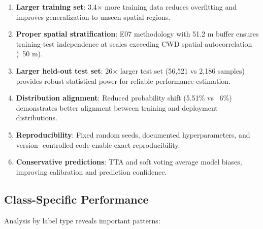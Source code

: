 \begin{enumerate}
    \item \textbf{Larger training set}: 3.4× more training data reduces overfitting and improves
          generalization to unseen spatial regions.

    \item \textbf{Proper spatial stratification}: E07 methodology with 51.2 m buffer ensures
          training-test independence at scales exceeding CWD spatial autocorrelation (~50 m).

    \item \textbf{Larger held-out test set}: 26× larger test set (56,521 vs 2,186 samples)
          provides robust statistical power for reliable performance estimation.

    \item \textbf{Distribution alignment}: Reduced probability shift (5.51\% vs ~6\%) demonstrates
          better alignment between training and deployment distributions.

    \item \textbf{Reproducibility}: Fixed random seeds, documented hyperparameters, and version-
          controlled code enable exact reproducibility.

    \item \textbf{Conservative predictions}: TTA and soft voting average model biases, improving
          calibration and prediction confidence.
\end{enumerate}

\subsection{Class-Specific Performance}

Analysis by label type reveals important patterns:

